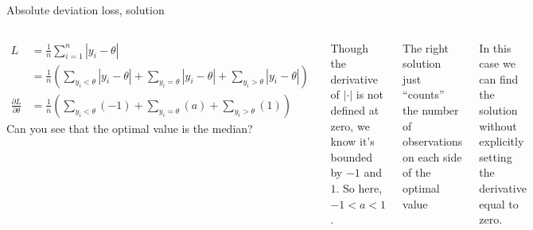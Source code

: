 \documentclass[aspectratio=169, handout]{beamer}
\begin{document}
\begin{frame}{Absolute deviation loss, solution}

\begin{columns}
\begin{align*}
L &= \frac{1}{n} \sum_{i = 1}^{n}|y_i - \theta|\\
&= \frac{1}{n} \left( \sum_{y_i < \theta}|y_i - \theta| + \sum_{y_i = \theta}|y_i - \theta| + \sum_{y_i > \theta}|y_i - \theta| \right)\\
\frac{\partial L}{\partial \theta} &= \frac{1}{n} \left( \sum_{y_i < \theta}(-1) + \sum_{y_i = \theta}(a) + \sum_{y_i > \theta}(1) \right)
\end{align*}
\pause
Can you see that the optimal value is the median?  

\vspace{5mm} Though the derivative of $|\cdot|$ is not defined at zero, we know it's bounded by $-1$ and $1$.  So here, $-1<a<1$.

\vspace{5mm}

\pause

The right solution just ``counts'' the number of observations on each side of the optimal value

\vspace{5mm}

In this case we can find the solution without explicitly setting the derivative equal to zero.  
\end{columns}

\end{frame}
\end{document}
